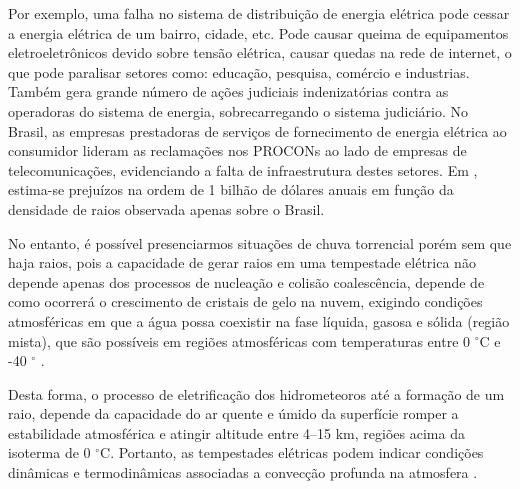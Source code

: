 Por exemplo, uma falha no sistema de distribuição de energia elétrica pode cessar a energia elétrica de um bairro, cidade, etc. Pode causar queima de equipamentos eletroeletrônicos devido sobre tensão elétrica, causar quedas na rede de internet, o que pode paralisar  setores como: educação, pesquisa, comércio e industrias. Também gera grande número de ações judiciais indenizatórias contra as operadoras do sistema de energia, sobrecarregando o sistema judiciário. No Brasil, as empresas prestadoras de serviços de  fornecimento de energia elétrica ao consumidor lideram as reclamações nos PROCONs ao lado de empresas de telecomunicações, evidenciando a falta de infraestrutura destes setores. Em , estima-se prejuízos na ordem de 1 bilhão de dólares anuais em função da densidade de raios observada apenas sobre o Brasil. 
  


No entanto, é possível presenciarmos situações de chuva torrencial porém sem que haja raios, pois a capacidade de gerar raios em uma tempestade elétrica não depende apenas dos processos de nucleação e colisão coalescência, depende de como ocorrerá o crescimento de cristais de gelo na nuvem, exigindo condições atmosféricas em que a água possa coexistir na fase líquida, gasosa e sólida (região mista), que são possíveis em regiões atmosféricas com temperaturas entre 0 $^{\circ}$C e -40 $^{\circ}$ \cite{Takahashi1978,williams1991mixed,korolev2007}.

Desta forma, o processo de eletrificação dos hidrometeoros até a formação de um raio, depende da capacidade do ar quente e úmido da superfície romper a estabilidade atmosférica e atingir altitude entre 4--15 km, regiões acima da isoterma de 0 $^{\circ}$C. Portanto, as tempestades elétricas podem indicar condições dinâmicas e termodinâmicas associadas a convecção profunda na atmosfera \cite{doswell2001,zipser2006}.


